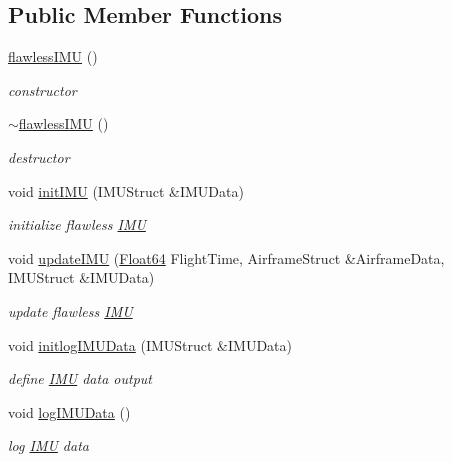 \subsection*{Public Member Functions}
\begin{DoxyCompactItemize}
\item 
\hyperlink{classflawless_i_m_u_af9797255e5bf1192d011c66d0e22fdb8}{flawless\+I\+MU} ()
\begin{DoxyCompactList}\small\item\em constructor \end{DoxyCompactList}\item 
\hyperlink{classflawless_i_m_u_ac9505afdbe3f879d0788c96b5a341982}{$\sim$flawless\+I\+MU} ()
\begin{DoxyCompactList}\small\item\em destructor \end{DoxyCompactList}\item 
void \hyperlink{classflawless_i_m_u_a7dd4d315fa319eef68987b17fb636c43}{init\+I\+MU} (I\+M\+U\+Struct \&I\+M\+U\+Data)
\begin{DoxyCompactList}\small\item\em initialize flawless \hyperlink{class_i_m_u}{I\+MU} \end{DoxyCompactList}\item 
void \hyperlink{classflawless_i_m_u_a3d3bf018147ba61788fd3e842dded37e}{update\+I\+MU} (\hyperlink{group___tools_ga3f1431cb9f76da10f59246d1d743dc2c}{Float64} Flight\+Time, Airframe\+Struct \&Airframe\+Data, I\+M\+U\+Struct \&I\+M\+U\+Data)
\begin{DoxyCompactList}\small\item\em update flawless \hyperlink{class_i_m_u}{I\+MU} \end{DoxyCompactList}\item 
void \hyperlink{classflawless_i_m_u_a4907331c4191fc36fd4f97655bb42c7e}{initlog\+I\+M\+U\+Data} (I\+M\+U\+Struct \&I\+M\+U\+Data)
\begin{DoxyCompactList}\small\item\em define \hyperlink{class_i_m_u}{I\+MU} data output \end{DoxyCompactList}\item 
void \hyperlink{classflawless_i_m_u_a31224296938675108b60a89948c459a8}{log\+I\+M\+U\+Data} ()
\begin{DoxyCompactList}\small\item\em log \hyperlink{class_i_m_u}{I\+MU} data \end{DoxyCompactList}\end{DoxyCompactItemize}


